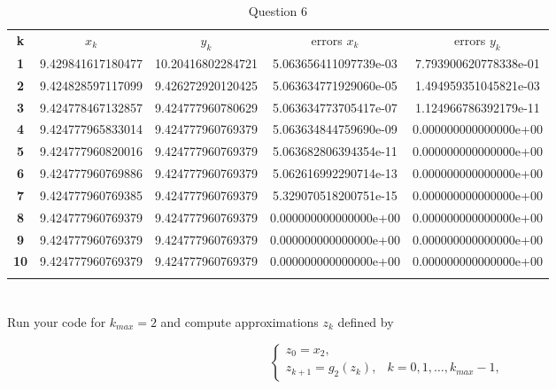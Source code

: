 \documentclass{article}
\begin{document}
\begin{table}[H]
    \centering
    \begin{tabular}{|c|c|c|c|c|}
    \Xhline{1 pt}
    \textbf{k} & $x_k$& $y_k$& \makecell{errors\\$x_k $ }  & \makecell{errors \\$y_k$}  \\
    \Xhline{2 pt}
    \textbf{1} &9.429841617180477&10.20416802284721 &5.063656411097739e-03& 7.793900620778338e-01 \\
    \Xhline{1 pt}
    \textbf{2} &9.424828597117099&	9.426272920120425& 5.063634771929060e-05 & 1.494959351045821e-03\\
    \Xhline{1 pt}
    \textbf{3} &9.424778467132857&9.424777960780629&5.063634773705417e-07& 1.124966786392179e-11  \\
    \Xhline{1 pt}
    \textbf{4} &9.424777965833014&	9.424777960769379& 5.063634844759690e-09 & 0.000000000000000e+00 \\
    \Xhline{1 pt}
    \textbf{5} &9.424777960820016&	9.424777960769379 &5.063682806394354e-11 & 0.000000000000000e+00 \\
    \Xhline{1 pt}
    \textbf{6} &9.424777960769886&	9.424777960769379& 5.062616992290714e-13  & 0.000000000000000e+00 \\
    \Xhline{1 pt}
    \textbf{7} &9.424777960769385&9.424777960769379&5.329070518200751e-15& 0.000000000000000e+00 \\
    \Xhline{1 pt}
    \textbf{8} &9.424777960769379&	9.424777960769379& 0.000000000000000e+00 & 0.000000000000000e+00 \\
    \Xhline{1 pt}
    \textbf{9} &9.424777960769379&	9.424777960769379& 0.000000000000000e+00&  0.000000000000000e+00\\
     \Xhline{1 pt}
    \textbf{10} &9.424777960769379&	9.424777960769379& 0.000000000000000e+00&  0.000000000000000e+00\\
    \Xhline{1 pt}
    \end{tabular}
    \caption{Question 6}
    \label{tab:my_label}
\end{table}
 	

\section{}
Run your code for $k_{max}=2$ and compute approximations $z_k$ defined by

\begin{equation}\label{eq:7}
    \begin{cases}
    z_0 = x_2,\\
    z_{k+1}=g_2(z_k), & k=0,1,\dots , k_{max}-1,
    \end{cases}
\end{equation}
\end{document}

